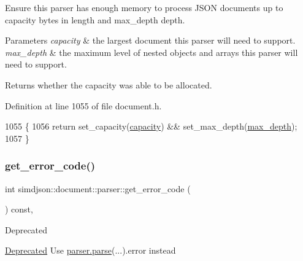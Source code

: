 Ensure this parser has enough memory to process J\+S\+ON documents up to {\ttfamily capacity} bytes in length and {\ttfamily max\+\_\+depth} depth. 


\begin{DoxyParams}{Parameters}
{\em capacity} & the largest document this parser will need to support. \\
\hline
{\em max\+\_\+depth} & the maximum level of nested objects and arrays this parser will need to support. \\
\hline
\end{DoxyParams}
\begin{DoxyReturn}{Returns}
whether the capacity was able to be allocated. 
\end{DoxyReturn}


Definition at line 1055 of file document.\+h.


\begin{DoxyCode}
1055                                                                                             \{
1056     \textcolor{keywordflow}{return} set\_capacity(\hyperlink{classsimdjson_1_1document_1_1parser_af9ea6b75fa9c41c6633fdcf059744cb2}{capacity}) && set\_max\_depth(\hyperlink{classsimdjson_1_1document_1_1parser_ae3ccf7ff0c0aa18d6ba70d3e063461b7}{max\_depth});
1057   \}
\end{DoxyCode}
\mbox{\label{classsimdjson_1_1document_1_1parser_ae22eec3516e3b91d62b5e275bdb58e71}} 
\subsubsection{\texorpdfstring{get\+\_\+error\+\_\+code()}{get\_error\_code()}}
{\footnotesize\ttfamily int simdjson\+::document\+::parser\+::get\+\_\+error\+\_\+code (\begin{DoxyParamCaption}{ }\end{DoxyParamCaption}) const\hspace{0.3cm}{\ttfamily [inline]}, {\ttfamily [noexcept]}}

\begin{DoxyRefDesc}{Deprecated}
\item[\hyperlink{deprecated__deprecated000007}{Deprecated}]Use {\ttfamily \hyperlink{classsimdjson_1_1document_1_1parser_a3eb1fd46ea0dad62eceed4b1c302b7ad}{parser.\+parse}(...).error} instead \end{DoxyRefDesc}


